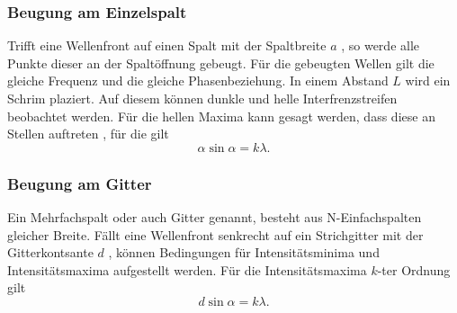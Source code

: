 \subsubsection{ Beugung am Einzelspalt}
\label{sec:Beugung am Einzelspalt}

Trifft eine Wellenfront auf einen Spalt mit der Spaltbreite $a$ , so werde  alle Punkte dieser an der Spaltöffnung gebeugt.
Für die gebeugten Wellen gilt die gleiche Frequenz und die gleiche Phasenbeziehung. In einem Abstand $L$ wird ein 
Schrim plaziert. Auf diesem können dunkle und helle Interfrenzstreifen beobachtet werden. Für die hellen Maxima kann gesagt 
werden, dass diese an Stellen auftreten , für die gilt
\begin{equation}
    \alpha \sin \alpha = k \lambda.
\end{equation}

\subsubsection{ Beugung am Gitter}
\label{sec:Beugung am Gitter}

Ein Mehrfachspalt oder auch Gitter genannt, besteht aus N-Einfachspalten gleicher Breite. Fällt eine Wellenfront
senkrecht auf ein Strichgitter mit der Gitterkontsante $d$ , können Bedingungen für Intensitätsminima und Intensitätsmaxima
aufgestellt werden.
Für die Intensitätsmaxima $k$-ter Ordnung gilt
\begin{equation}
    d \sin \alpha = k \lambda.
\end{equation}